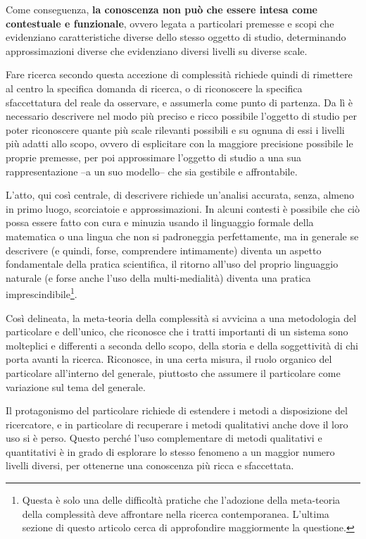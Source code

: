 \documentclass[a4paper, headings=standardclasses]{scrartcl}
\begin{document}
Come conseguenza, \textbf{la conoscenza non può che essere intesa come contestuale e funzionale}, ovvero legata a particolari premesse e scopi che evidenziano caratteristiche diverse dello stesso oggetto di studio, determinando approssimazioni diverse che evidenziano diversi livelli su diverse scale.

Fare ricerca secondo questa accezione di complessità richiede quindi di rimettere al centro la specifica domanda di ricerca, o di riconoscere la specifica sfaccettatura del reale da osservare, e assumerla come punto di partenza.
Da lì è necessario descrivere nel modo più preciso e ricco possibile l'oggetto di studio per poter riconoscere quante più scale rilevanti possibili e su ognuna di essi i livelli più adatti allo scopo, ovvero di esplicitare con la maggiore precisione possibile le proprie premesse, per poi approssimare l'oggetto di studio a una sua rappresentazione --a un suo modello-- che sia gestibile e affrontabile.

L'atto, qui così centrale, di descrivere richiede un'analisi accurata, senza, almeno in primo luogo, scorciatoie e approssimazioni. In alcuni contesti è possibile che ciò possa essere fatto con cura e minuzia usando il linguaggio formale della matematica o una lingua che non si padroneggia perfettamente, ma in generale se descrivere (e quindi, forse, comprendere intimamente) diventa un aspetto fondamentale della pratica scientifica, il ritorno all'uso del proprio linguaggio naturale (e forse anche l'uso della multi-medialità) diventa una pratica imprescindibile\footnote{Questa è solo una delle difficoltà pratiche che l'adozione della meta-teoria della complessità deve affrontare nella ricerca contemporanea. L'ultima sezione di questo articolo cerca di approfondire maggiormente la questione.}.

Così delineata, la meta-teoria della complessità si avvicina a una metodologia del particolare e dell'unico, che riconosce che i tratti importanti di un sistema sono molteplici e differenti a seconda dello scopo, della storia e della soggettività di chi porta avanti la ricerca. Riconosce, in una certa misura, il ruolo organico del particolare all'interno del generale, piuttosto che assumere il particolare come variazione sul tema del generale. 

Il protagonismo del particolare richiede di estendere i metodi a disposizione del ricercatore, e in particolare di recuperare i metodi qualitativi anche dove il loro uso si è perso. Questo perché l'uso complementare di metodi qualitativi e quantitativi è in grado di esplorare lo stesso fenomeno a un maggior numero livelli diversi, per ottenerne una conoscenza più ricca e sfaccettata.
\end{document}
